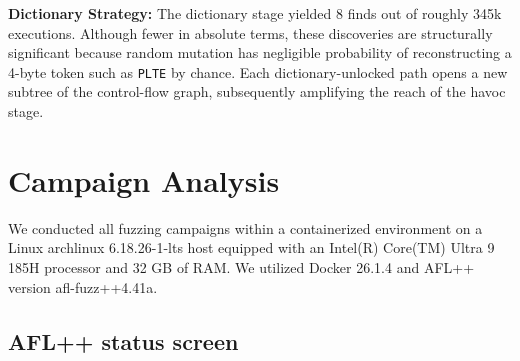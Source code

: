 \documentclass[letterpaper,twocolumn,10pt]{article}
\begin{document}

\textbf{Dictionary Strategy:} The dictionary stage yielded 8 finds out of roughly 345k executions. Although fewer in absolute terms, these discoveries are structurally significant because random mutation has negligible probability of reconstructing a 4-byte token such as \lstinline|PLTE| by chance. Each dictionary-unlocked path opens a new subtree of the control-flow graph, subsequently amplifying the reach of the havoc stage. 





\section{Campaign Analysis}
\label{sec:q4}
We conducted all fuzzing campaigns within a containerized environment on a Linux archlinux 6.18.26-1-lts host equipped with an Intel(R) Core(TM) Ultra 9 185H processor and 32 GB of RAM. We utilized Docker 26.1.4 and AFL++ version afl-fuzz++4.41a. 

\subsection{AFL++ status screen}
\end{document}
